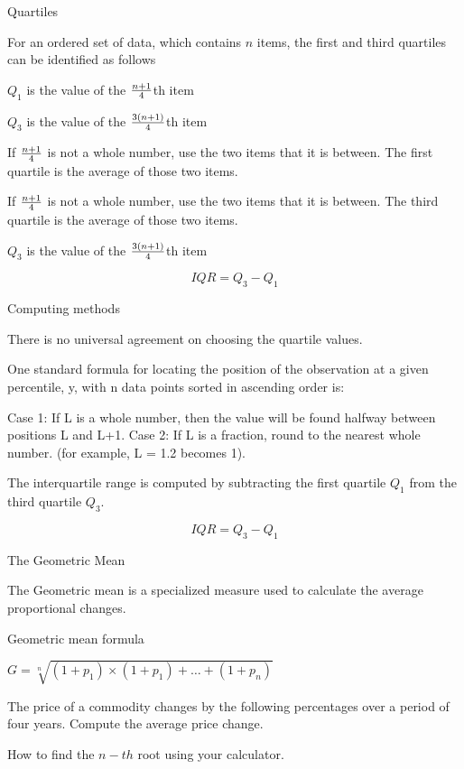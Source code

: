 Quartiles

For an ordered set of data, which contains $n$ items, the first and third quartiles can be identified as follows

$Q_1$ is the value of the $ {n+1\over 4}$th item


$Q_3$ is the value of the $ {3(n+1)\over 4}$th item


If ${n+1\over 4}$ is not a whole number, use the two items that it is between. The first quartile is the average of those two items.

If ${n+1\over 4}$ is not a whole number, use the two items that it is between. The third quartile is the average of those two items.







$Q_3$ is the value of the $ {3(n+1)\over 4}$th item






\[ IQR = Q_3 - Q_1 \]


Computing methods

There is no universal agreement on choosing the quartile values.


One standard formula for locating the position of the observation at a given percentile, y, 
with n data points sorted in ascending order is:

 
Case 1: If L is a whole number, then the value will be found halfway between positions L and L+1. 
Case 2: If L is a fraction, round to the nearest whole number. (for example, L = 1.2 becomes 1). 

The interquartile range is computed by subtracting the first quartile $Q_1$ from the third quartile $Q_3$.

\[ IQR = Q_3 - Q_1 \]



The Geometric Mean

The Geometric mean is a specialized measure used to calculate the average proportional changes.

Geometric mean formula

$G = \sqrt[n]{(1+p_1) \times (1+p_1) +  \ldots + (1+p_n)}$

The price of a commodity changes by the following percentages over a period of four years.
Compute the average price change.


How to find the $n-th$ root using your calculator.

